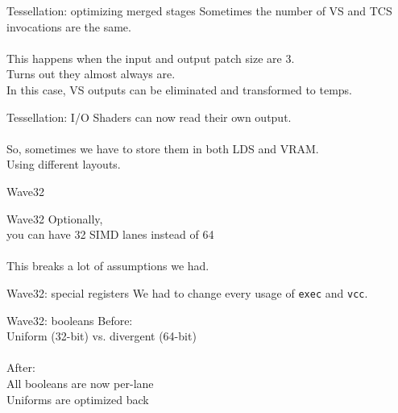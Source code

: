 \documentclass[aspectratio=169,t,xcolor=table]{beamer}
\begin{document}
\begin{frame}{Tessellation: optimizing merged stages}
    \LARGE
    Sometimes the number of VS and TCS invocations are the same. \\
    \ \\
    \normalsize
    This happens when the input and output patch size are 3. \\
    Turns out they almost always are. \\
    In this case, VS outputs can be eliminated and transformed to temps.
\end{frame}

\begin{frame}{Tessellation: I/O}
    \LARGE
    Shaders can now read their own output. \\
    \ \\
    \normalsize
    So, sometimes we have to store them in both LDS and VRAM. \\
    Using different layouts.
\end{frame}

\begin{frame}{Wave32}
\end{frame}

\begin{frame}{Wave32}
    \normalsize
    Optionally, \\
    \LARGE
    you can have 32 SIMD lanes instead of 64 \\
    \ \\
    \normalsize
    This breaks a lot of assumptions we had.
\end{frame}

\begin{frame}{Wave32: special registers}
    \LARGE
    We had to change every usage of \texttt{exec} and \texttt{vcc}.
\end{frame}

\begin{frame}{Wave32: booleans}
    \normalsize
    Before: \\
    \LARGE
    Uniform (32-bit) vs. divergent (64-bit) \\
    \ \\
    \normalsize
    After: \\
    \LARGE
    All booleans are now per-lane \\
    Uniforms are optimized back
\end{frame}
\end{document}
